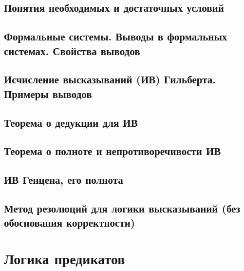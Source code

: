 \documentclass[a4paper]{article}
\theoremstyle{definition}
\theoremstyle{remark}
\begin{document}
    \subsection{Понятия необходимых и достаточных условий}
    \subsection{Формальные системы. Выводы в формальных системах. Свойства выводов}
    \subsection{Исчисление высказываний (ИВ) Гильберта. Примеры выводов}
    \subsection{Теорема о дедукции для ИВ}
    \subsection{Теорема о полноте и непротиворечивости ИВ}
    \subsection{ИВ Генцена, его полнота}
    \subsection{Метод резолюций для логики высказываний (без обоснования корректности)}
    \section{Логика предикатов}
\end{document}
